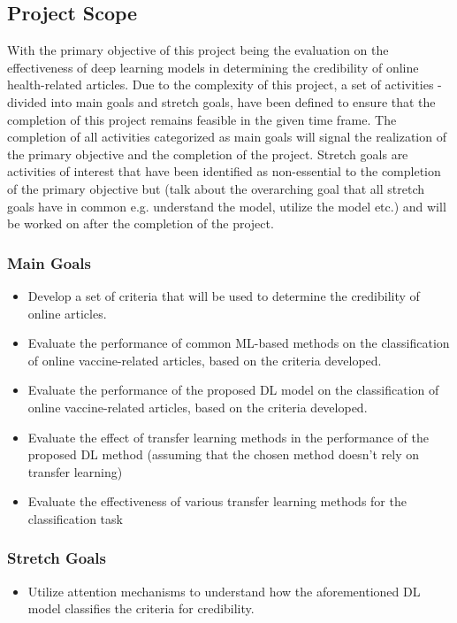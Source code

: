 \documentclass[a4paper,twoside,phd]{BYUPhys}
\begin{document}
\subsection{Project Scope}
\label{sec:ProjectScope}

With the primary objective of this project being the evaluation on the effectiveness of deep learning models in determining the credibility of online health-related articles. Due to the complexity of this project, a set of activities - divided into main goals and stretch goals, have been defined to ensure that the completion of this project remains feasible in the given time frame. The completion of all activities categorized as main goals will signal the realization of the primary objective and the completion of the project. Stretch goals are activities of interest that have been identified as non-essential to the completion of the primary objective but (talk about the overarching goal that all stretch goals have in common e.g. understand the model, utilize the model etc.) and will be worked on after the completion of the project.

\subsubsection{Main Goals}
\begin{itemize}
	\item Develop a set of criteria that will be used to determine the credibility of online articles.
	\item Evaluate the performance of common ML-based methods on the classification of online vaccine-related articles, based on the criteria developed.
	\item Evaluate the performance of the proposed DL model on the classification of online vaccine-related articles, based on the criteria developed.
	\item Evaluate the effect of transfer learning methods in the performance of the proposed DL method (assuming that the chosen method doesn't rely on transfer learning)
	\item Evaluate the effectiveness of various transfer learning methods for the classification task
\end{itemize}



\subsubsection{Stretch Goals}
\begin{itemize}
	\item Utilize attention mechanisms to understand how the aforementioned DL model classifies the criteria for credibility.
\end{itemize}
\end{document}

